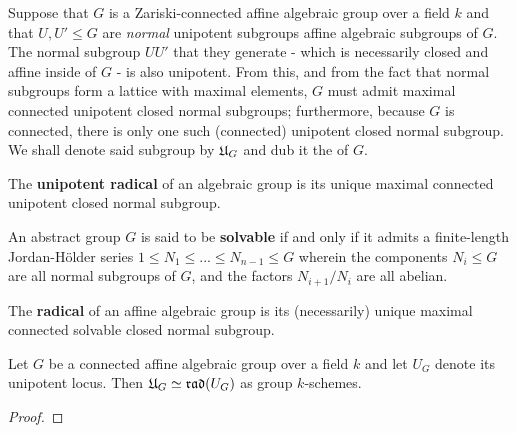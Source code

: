             \begin{remark} \label{remark: existence_and_uniqueness_of_unipotent_radicals}
                Suppose that $G$ is a Zariski-connected affine algebraic group over a field $k$ and that $U, U' \leq G$ are \textit{normal} unipotent subgroups affine algebraic subgroups of $G$. The normal subgroup $UU'$ that they generate - which is necessarily closed and affine inside of $G$ - is also unipotent. From this, and from the fact that normal subgroups form a lattice with maximal elements, $G$ must admit maximal connected unipotent closed normal subgroups; furthermore, because $G$ is connected, there is only one such (connected) unipotent closed normal subgroup. We shall denote said subgroup by $\mathfrak{U}_G$ and dub it the  of $G$.   
            \end{remark}
            \begin{definition} \label{def: unipotent_radicals_of_affine_algebraic_groups}
                The \textbf{unipotent radical} of an algebraic group is its unique maximal connected unipotent closed normal subgroup.
            \end{definition}
            \begin{definition}[Solvability] \label{def: solvability}
                An abstract group $G$ is said to be \textbf{solvable} if and only if it admits a finite-length Jordan-H\"older series $1 \leq N_1 \leq ... \leq N_{n - 1} \leq G$ wherein the components $N_i \leq G$ are all normal subgroups of $G$, and the factors $N_{i + 1}/N_i$ are all abelian.  
            \end{definition}
            \begin{definition} \label{def: radicals_of_affine_algebraic_groups}
                The \textbf{radical} of an affine algebraic group is its (necessarily) unique maximal connected solvable closed normal subgroup.
            \end{definition}
            \begin{proposition} \label{prop: unipotent_radicals_are_radicals_of_unipotent_loci}
                Let $G$ be a connected affine algebraic group over a field $k$ and let $U_G$ denote its unipotent locus. Then $\mathfrak{U}_G \simeq \mathfrak{rad}(U_G)$ as group $k$-schemes.
            \end{proposition}
                \begin{proof}
                            
                \end{proof}
